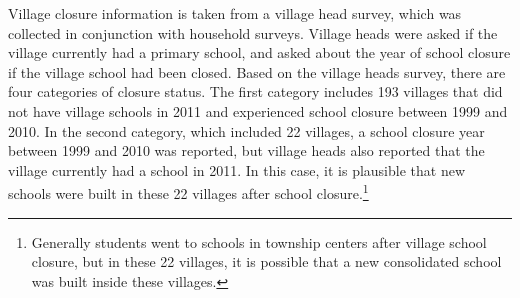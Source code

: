 \documentclass[12pt,english]{article}
\begin{document}
Village closure information is taken from a village head survey, which was collected in conjunction with household surveys. Village heads were asked if the village currently had a primary school, and asked about the year of school closure if the village school had been closed. Based on the village heads survey, there are four categories of closure status. The first category includes 193 villages that did not have village schools in 2011 and experienced school closure between 1999 and 2010. In the second category, which included 22 villages, a school closure year between 1999 and 2010 was reported, but village heads also reported that the village currently had a school in 2011. In this case, it is plausible that new schools were built in these 22 villages after school closure.\footnote{Generally students went to schools in township centers after village school closure, but in these 22 villages, it is possible that a new consolidated school was built inside these villages.}

\pagebreak
\begingroup
\setlength\bibitemsep{0pt}
\printbibliography
\endgroup
\pagebreak
\end{document}
